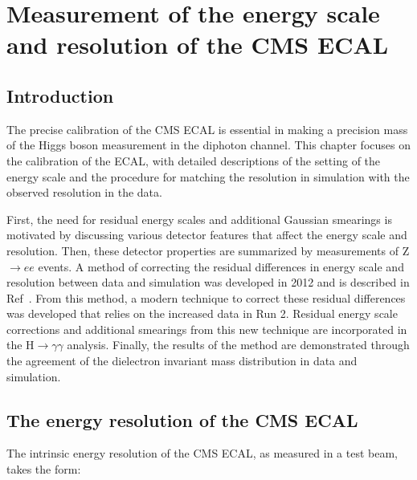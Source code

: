 \chapter{Measurement of the energy scale and resolution of the CMS ECAL}
\label{chap:scales}


\section{Introduction}

The precise calibration of the CMS ECAL is essential in making a precision mass of the Higgs boson measurement in the diphoton channel. This chapter focuses on the calibration of the ECAL, with detailed descriptions of the setting of the energy scale and the procedure for matching the resolution in simulation with the observed resolution in the data. 

First, the need for residual energy scales and additional Gaussian smearings is motivated by discussing various detector features that affect the energy scale and resolution. Then, these detector properties are summarized by measurements of Z$\rightarrow ee$ events. A method of correcting the residual differences in energy scale and resolution between data and simulation was developed in 2012 and is described in Ref~\cite{Nourbakhsh:1969408}. From this method, a modern technique to correct these residual differences was developed that relies on the increased data in Run 2. Residual energy scale corrections and additional smearings from this new technique are incorporated in the H$\rightarrow\gamma\gamma$ analysis. Finally, the results of the method are demonstrated through the agreement of the dielectron invariant mass distribution in data and simulation.

\section{The energy resolution of the CMS ECAL}

The intrinsic energy resolution of the CMS ECAL, as measured in a test beam, takes the form:

